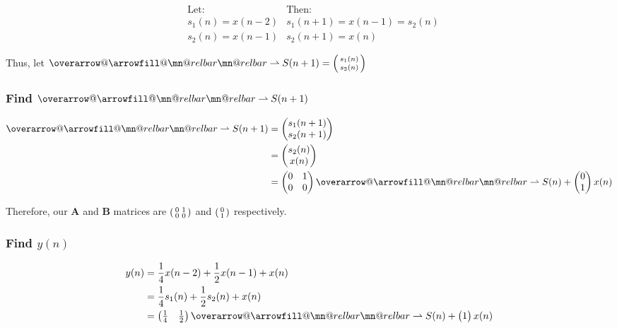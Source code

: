 \documentclass{article}
\makeatletter
\renewcommand{\thesubsubsection}{\thesection.\alph{subsection}.\Roman{subsubsection}}
\DeclareRobustCommand{\overrightharpoon}{\mathpalette{\overarrow@\rightharpoonfill@}}
\def\rightharpoonfill@{\arrowfill@\mn@relbar\mn@relbar\rightharpoonup}
\makeatother
\begin{document}
\begin{align*}
	&\text{Let:}& \text{Then:} \\
	&s_1(n) = x(n - 2) & s_1(n + 1) = x(n - 1) = s_2(n) \\
	&s_2(n) = x(n - 1) & s_2(n + 1) = x(n)
\end{align*}

Thus, let $\overrightharpoon{S(n + 1)} = \begin{psmallmatrix} s_1(n) \\ s_2(n) \end{psmallmatrix}$

\subsubsection[~\thesubsubsection]{Find $\overrightharpoon{S(n + 1)}$}

\begin{align*}
	\overrightharpoon{S(n + 1)} &= \begin{pmatrix} s_1(n + 1) \\ s_2(n + 1) \end{pmatrix} \\
	&= \begin{pmatrix} s_2(n) \\ x(n) \end{pmatrix} \\
	&= \begin{pmatrix} 0 & 1 \\ 0 & 0 \end{pmatrix}\overrightharpoon{S(n)} + \begin{pmatrix} 0 \\ 1 \end{pmatrix}x(n)
\end{align*}

Therefore, our $\boldsymbol{A}$ and $\boldsymbol{B}$ matrices are $\begin{psmallmatrix} 0 & 1 \\ 0 & 0 \end{psmallmatrix}$ and $\begin{psmallmatrix} 0 \\ 1 \end{psmallmatrix}$ respectively.

\subsubsection[~\thesubsubsection]{Find $y(n)$}

\begin{align*}
	y(n) &= \frac{1}{4}x(n - 2) + \frac{1}{2}x(n - 1) + x(n) \\
	&= \frac{1}{4}s_1(n) + \frac{1}{2}s_2(n) + x(n) \\
	&= \begin{pmatrix} \frac{1}{4} & \frac{1}{2} \end{pmatrix}\overrightharpoon{S(n)} + \begin{pmatrix} 1 \end{pmatrix}x(n)
\end{align*}
\end{document}

